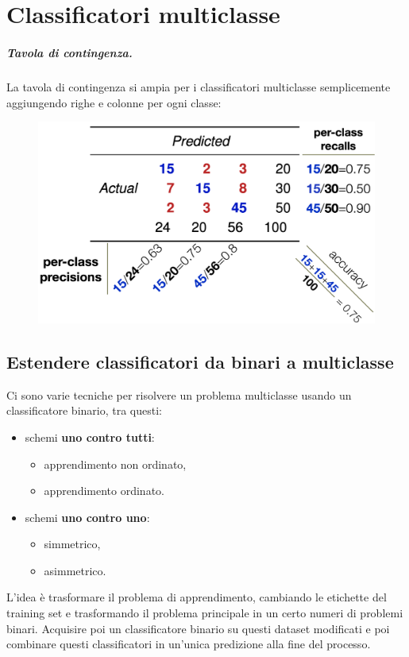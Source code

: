 \chapter{Classificatori multiclasse}
\paragraph{Tavola di contingenza.} La tavola di contingenza si ampia per i classificatori multiclasse semplicemente aggiungendo righe e colonne per ogni classe:
\begin{figure}[!h]
    \centering
    \includegraphics[scale=0.3]{images/multiContTab.png}
    \label{fig:enter-label}
\end{figure}

\section{Estendere classificatori da binari a multiclasse}
Ci sono varie tecniche per risolvere un problema multiclasse usando un classificatore binario, tra questi:
\begin{itemize}
    \item schemi \textbf{uno contro tutti}:
        \begin{itemize}
            \item apprendimento non ordinato,
            \item apprendimento ordinato.
        \end{itemize}
    \item schemi \textbf{uno contro uno}:
        \begin{itemize}
            \item simmetrico,
            \item asimmetrico.
        \end{itemize}
\end{itemize}
L'idea è trasformare il problema di apprendimento, cambiando le etichette del training set e trasformando il problema principale in un certo numeri di problemi binari. Acquisire poi un classificatore binario su questi dataset modificati e poi combinare questi classificatori in un'unica predizione alla fine del processo.

